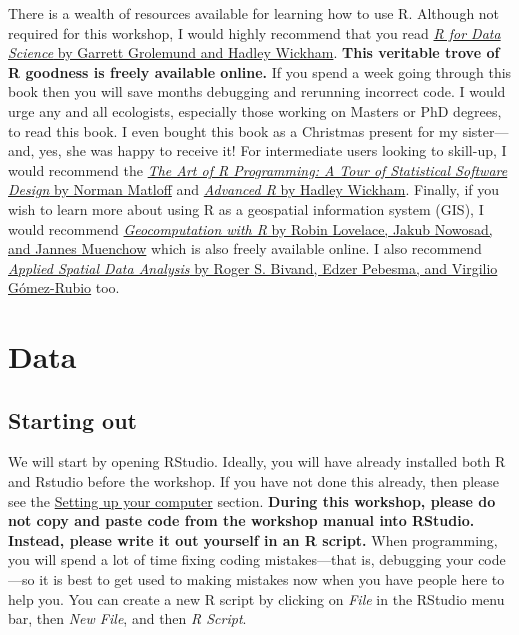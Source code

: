 \documentclass[12pt,]{book}
\begin{document}
There is a wealth of resources available for learning how to use R.
Although not required for this workshop, I would highly recommend that
you read \href{https://r4ds.had.co.nz/}{\emph{R for Data Science} by
Garrett Grolemund and Hadley Wickham}. \textbf{This veritable trove of R
goodness is freely available online.} If you spend a week going through
this book then you will save months debugging and rerunning incorrect
code. I would urge any and all ecologists, especially those working on
Masters or PhD degrees, to read this book. I even bought this book as a
Christmas present for my sister---and, yes, she was happy to receive it!
For intermediate users looking to skill-up, I would recommend the
\href{http://shop.oreilly.com/product/9781593273842.do}{\emph{The Art of
R Programming: A Tour of Statistical Software Design} by Norman Matloff}
and \href{https://adv-r.hadley.nz/}{\emph{Advanced R} by Hadley
Wickham}. Finally, if you wish to learn more about using R as a
geospatial information system (GIS), I would recommend
\href{https://geocompr.robinlovelace.net/}{\emph{Geocomputation with R}
by Robin Lovelace, Jakub Nowosad, and Jannes Muenchow} which is also
freely available online. I also recommend
\href{https://www.springer.com/gp/book/9781461476177}{\emph{Applied
Spatial Data Analysis} by Roger S. Bivand, Edzer Pebesma, and Virgilio
Gómez-Rubio} too.

\chapter{Data}\label{data}

\section{Starting out}\label{starting-out}

We will start by opening RStudio. Ideally, you will have already
installed both R and Rstudio before the workshop. If you have not done
this already, then please see the \protect\hyperlink{setup}{Setting up
your computer} section. \textbf{During this workshop, please do not copy
and paste code from the workshop manual into RStudio. Instead, please
write it out yourself in an R script.} When programming, you will spend
a lot of time fixing coding mistakes---that is, debugging your code---so
it is best to get used to making mistakes now when you have people here
to help you. You can create a new R script by clicking on \emph{File} in
the RStudio menu bar, then \emph{New File}, and then \emph{R Script}.
\end{document}
